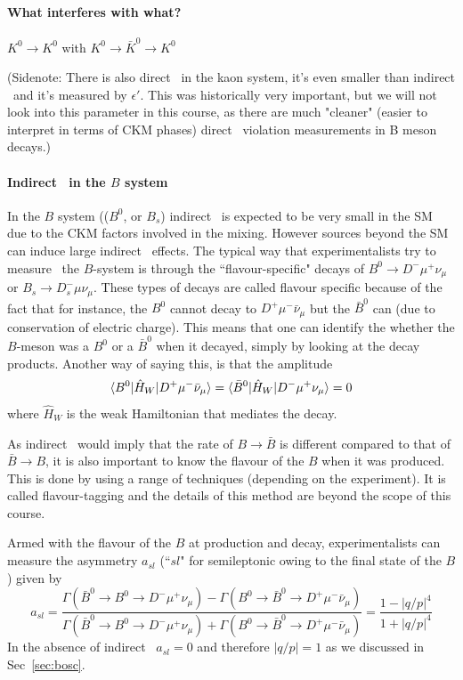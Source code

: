 \paragraph{What interferes with what?}
$K^0 \to K^0$ with $K^0 \to \bar{K}^0 \to K^0$

(Sidenote: There is also direct \cpv\ in the kaon system, it's even smaller than indirect \cpv\ and it's measured by $\epsilon'$. This was historically very important, but we will not look into this parameter in this course, as there are much "cleaner" (easier to interpret in terms of CKM phases) direct \cp\ violation measurements in B meson decays.)

\paragraph{Indirect \cpv\ in the $B$ system}


In the $B$ system (($B^0$, or $B_s$) indirect \cpv\ is expected to be very small in the SM due to the CKM factors involved in the mixing. However sources beyond the SM can induce large indirect \cpv\ effects.
The typical way that experimentalists try to measure \cpv\ the $B$-system is through the ``flavour-specific" decays of $B^0\to D^-\mu^+\nu_{\mu}$ or  $B_s \to D_{s}^{-}\mu\nu_{\mu}$. These types of decays are called flavour specific because of the fact that for instance, the $B^0$ cannot decay to $D^+\mu^-\bar{\nu}_{\mu}$ but the $\bar{B}^0$ can (due to conservation of electric charge). This means that one can identify the whether the $B$-meson was a $B^0$ or a $\bar{B}^0$ when it decayed, simply by looking at the decay products. Another way of saying this, is that the amplitude 
\begin{equation}
 \langle B^{0} |\hat{H}_{W} | D^+\mu^-\bar{\nu}_{\mu} \rangle =  \langle \bar{B}^{0} |\hat{H}_{W} | D^-\mu^+\nu_{\mu} \rangle = 0
\end{equation}
where $\hat{H}_{W}$ is the weak Hamiltonian that mediates the decay.

As indirect \cpv\ would imply that the rate of $B\to\bar{B}$ is different compared to that of $\bar{B}\to B$, it is also important to know the flavour of the $B$ when it was produced. This is done by using a range of techniques (depending on the experiment). It is called flavour-tagging and the details of this method are beyond the scope of this course. 

Armed with the flavour of the $B$ at production and decay, experimentalists can measure the asymmetry $a_{sl}$ (``$sl$" for semileptonic owing to the final state of the $B$) given by
\begin{equation}
a_{sl}=\frac{\Gamma(\bar{B}^{0}\to B^0\to  D^-\mu^+\nu_{\mu}) - \Gamma(B^{0}\to \bar{B}^0\to  D^+\mu^-\bar{\nu}_{\mu})}{\Gamma(\bar{B}^{0}\to B^0\to  D^-\mu^+\nu_{\mu}) + \Gamma(B^{0}\to \bar{B}^0\to  D^+\mu^-\bar{\nu}_{\mu})} = \frac{1-|q/p|^4}{1+|q/p|^4}
\end{equation}
In the absence of indirect \cpv\, $a_{sl}=0$ and therefore $|q/p|=1$ as we discussed in Sec~\ref{sec:bosc}.


